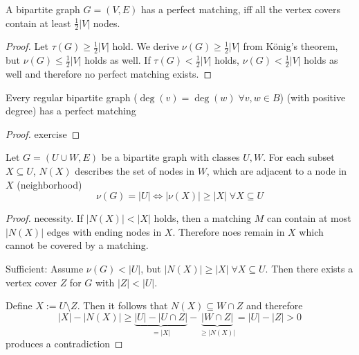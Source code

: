 \begin{lec}[2011-11-07]\end{lec}


\begin{cor}
	A bipartite graph $G=(V,E)$ has a perfect matching, iff all the vertex covers contain at least $\frac{1}{2} |V|$ nodes.
\end{cor}

\begin{proof}
	Let $\tau(G) \geq \frac{1}{2} |V|$ hold. We derive $\nu(G) \geq \frac{1}{2} |V|$ from König's theorem, but $\nu(G) \leq \frac{1}{2} |V|$ holds as well. If $\tau(G) < \frac{1}{2} |V|$ holds, $\nu(G) < \frac{1}{2} |V|$ holds as well and therefore no perfect matching exists.
\end{proof}

\begin{cor}
	Every regular bipartite graph ($\deg(v) = \deg(w) \; \forall v,w \in B$) (with positive degree) has a perfect matching
\end{cor}

\begin{proof}
	exercise
\end{proof}

\begin{thm}
	Let $G =( U \cup W, E)$ be a bipartite graph with classes $U, W$. For each subset $X \subseteq U$, $N(X)$ describes the set of nodes in $W$, which are adjacent to a node in $X$ (neighborhood)
	\[
		\nu(G) = |U| \Leftrightarrow | \nu(X)| \geq |X| \; \forall X \subseteq U
	\]
\end{thm}

\begin{proof}
	necessity. If $|N(X)| < |X|$ holds, then a matching $M$ can contain at most 
	$| N(X)|$ edges with ending nodes in $X$. Therefore noes remain in $X$ which 
	cannot be covered by a matching.
	
	Sufficient: Assume $\nu(G)<|U|$, but $|N(X)| \geq |X| \; \forall X \subseteq U$.
	Then there exists a vertex cover $Z$ for $G$ with $|Z| < |U|$.
	
	Define $X:=U \setminus Z$. Then it follows that $N(X) \subseteq W \cap Z$ and 
	therefore \[
		|X| - |N(X)| \geq \underbrace{|U| - |U \cap Z|}_{=|X|} - \underbrace{| W \cap Z |}_{\geq |N(X)|} = |U| - |Z| > 0
	\]
	produces a contradiction
\end{proof}


